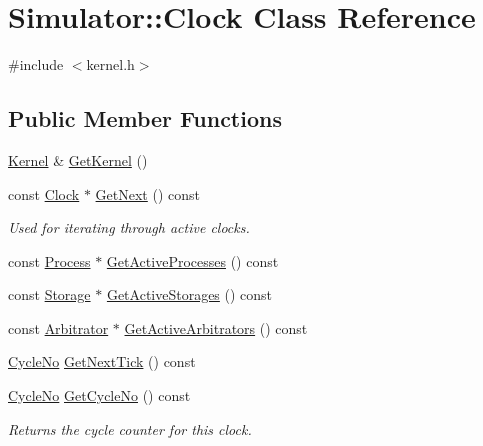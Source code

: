 \hypertarget{class_simulator_1_1_clock}{\section{Simulator\+:\+:Clock Class Reference}
\label{class_simulator_1_1_clock}
}


{\ttfamily \#include $<$kernel.\+h$>$}

\subsection*{Public Member Functions}
\begin{DoxyCompactItemize}
\item 
\hyperlink{class_simulator_1_1_kernel}{Kernel} \& \hyperlink{class_simulator_1_1_clock_af2d37b476969e4c081f373d4289cdd77}{Get\+Kernel} ()
\item 
const \hyperlink{class_simulator_1_1_clock}{Clock} $\ast$ \hyperlink{class_simulator_1_1_clock_ac9f77a912cfccb11f13b8bac1856b94f}{Get\+Next} () const 
\begin{DoxyCompactList}\small\item\em Used for iterating through active clocks. \end{DoxyCompactList}\item 
const \hyperlink{class_simulator_1_1_process}{Process} $\ast$ \hyperlink{class_simulator_1_1_clock_a6ba1a05417d234e27b60a63093e763bc}{Get\+Active\+Processes} () const 
\item 
const \hyperlink{class_simulator_1_1_storage}{Storage} $\ast$ \hyperlink{class_simulator_1_1_clock_a84be4a7d805dae493b2d163d8317f718}{Get\+Active\+Storages} () const 
\item 
const \hyperlink{class_simulator_1_1_arbitrator}{Arbitrator} $\ast$ \hyperlink{class_simulator_1_1_clock_a3cad12dad6b91c89fe080557f24f1703}{Get\+Active\+Arbitrators} () const 
\item 
\hyperlink{namespace_simulator_a928f1e2101eba21bb0fe409e8c9ce573}{Cycle\+No} \hyperlink{class_simulator_1_1_clock_a163aff5e2f52dfbffce4353b9b2b790f}{Get\+Next\+Tick} () const 
\item 
\hyperlink{namespace_simulator_a928f1e2101eba21bb0fe409e8c9ce573}{Cycle\+No} \hyperlink{class_simulator_1_1_clock_a1a840aaeb898581ab6234c3ccb135c68}{Get\+Cycle\+No} () const 
\begin{DoxyCompactList}\small\item\em Returns the cycle counter for this clock. \end{DoxyCompactList}\item 

\end{DoxyCompactItemize}
